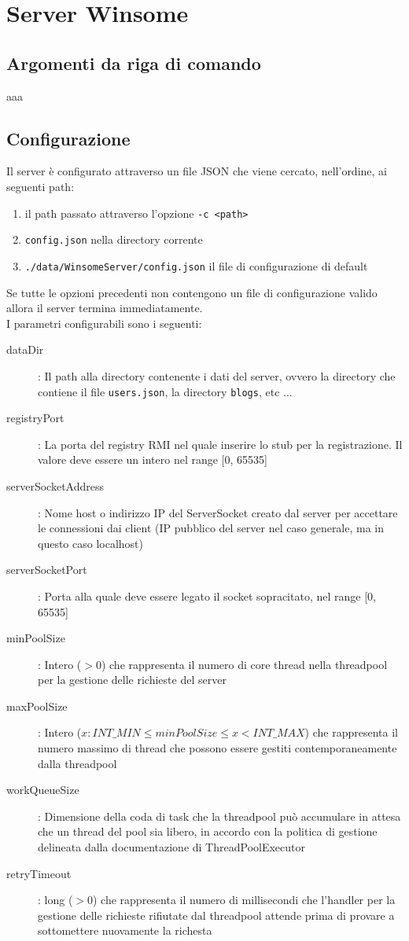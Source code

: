\section{Server Winsome}
\subsection{Argomenti da riga di comando}
aaa
\subsection{Configurazione}
Il server è configurato attraverso un file JSON che viene cercato, nell'ordine, ai seguenti path:
\begin{enumerate}
	\item il path passato attraverso l'opzione \verb|-c <path>|
	\item \verb|config.json| nella directory corrente
	\item \verb|./data/WinsomeServer/config.json| il file di configurazione di default
\end{enumerate}
Se tutte le opzioni precedenti non contengono un file di configurazione valido allora il server termina immediatamente.\\
I parametri configurabili sono i seguenti:
\begin{description}
	\item[dataDir]: Il path alla directory contenente i dati del server, ovvero la directory
	che contiene il file \verb|users.json|, la directory \verb|blogs|, etc ...
	\item[registryPort]: La porta del registry RMI nel quale inserire lo stub per la registrazione. Il valore deve essere un intero nel range [0, 65535]
	\item[serverSocketAddress]: Nome host o indirizzo IP del ServerSocket creato dal server per accettare le connessioni dai client (IP pubblico del server nel caso generale, ma in questo caso localhost)
	\item[serverSocketPort]: Porta alla quale deve essere legato il socket sopracitato, nel range [0, 65535]
	\item[minPoolSize]: Intero ($>0$) che rappresenta il numero di core thread nella threadpool per la gestione delle richieste del server
	\item[maxPoolSize]: Intero ($x : INT\_MIN \le minPoolSize \le x < INT\_MAX$) che rappresenta il numero massimo di thread che possono essere gestiti contemporaneamente dalla threadpool
	\item[workQueueSize]: Dimensione della coda di task che la threadpool può accumulare in attesa che un thread del pool sia libero, in accordo con la politica di gestione delineata dalla documentazione di ThreadPoolExecutor
	\item[retryTimeout]: long ($>0$) che rappresenta il numero di millisecondi che l'handler per la gestione delle richieste rifiutate dal threadpool attende prima di provare a sottomettere nuovamente la richesta
\end{description}
